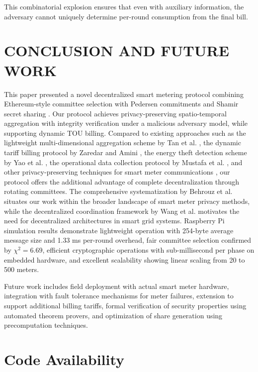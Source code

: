 \documentclass[conference]{IEEEtran}
\begin{document}
This combinatorial explosion ensures that even with auxiliary information, the adversary cannot uniquely determine per-round consumption from the final bill.

\section{CONCLUSION AND FUTURE WORK}

This paper presented a novel decentralized smart metering protocol combining Ethereum-style committee selection with Pedersen commitments \cite{pedersen1991non} and Shamir secret sharing \cite{shamir1979how}. Our protocol achieves privacy-preserving spatio-temporal aggregation with integrity verification under a malicious adversary model, while supporting dynamic TOU billing. Compared to existing approaches such as the lightweight multi-dimensional aggregation scheme by Tan et al. \cite{tan2024lppmm}, the dynamic tariff billing protocol by Zaredar and Amini \cite{zaredar2024lightweight}, the energy theft detection scheme by Yao et al. \cite{yao2024theft}, the operational data collection protocol by Mustafa et al. \cite{mustafa2023secure}, and other privacy-preserving techniques for smart meter communications \cite{parameswarath2024provenance, shateri2024realtime, tran2024hybrid, hong2018privacy}, our protocol offers the additional advantage of complete decentralization through rotating committees. The comprehensive systematization by Behrouz et al. \cite{behrouz2024privacy} situates our work within the broader landscape of smart meter privacy methods, while the decentralized coordination framework by Wang et al. \cite{wang2024decentralized} motivates the need for decentralized architectures in smart grid systems. Raspberry Pi simulation results demonstrate lightweight operation with 254-byte average message size and 1.33 ms per-round overhead, fair committee selection confirmed by \(\chi^2 = 6.69\), efficient cryptographic operations with sub-millisecond per phase on embedded hardware, and excellent scalability showing linear scaling from 20 to 500 meters.

Future work includes field deployment with actual smart meter hardware, integration with fault tolerance mechanisms for meter failures, extension to support additional billing tariffs, formal verification of security properties using automated theorem provers, and optimization of share generation using precomputation techniques.

\section*{Code Availability}
\end{document}
